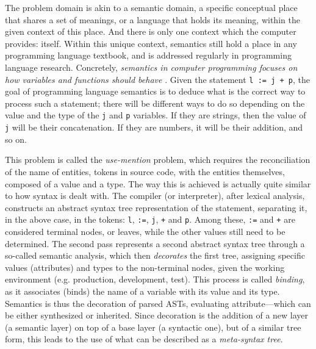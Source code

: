 The problem domain is akin to a semantic domain, a specific conceptual place that shares a set of meanings, or a language that holds its meaning, within the given context of this place. And there is only one context which the computer provides: itself. Within this unique context, semantics still hold a place in any programming language textbook, and is addressed regularly in programming language research. Concretely, \emph{semantics in computer programming focuses on how variables and functions should behave} \citep{sethi_programming_1996}. Given the statement \lstinline{l := j + p}, the goal of programming language semantics is to deduce what is the correct way to process such a statement; there will be different ways to do so depending on the value and the type of the \lstinline{j} and \lstinline{p} variables. If they are strings, then the value of \lstinline{j} will be their concatenation. If they are numbers, it will be their addition, and so on.

This problem is called the \emph{use-mention} problem, which requires the reconciliation of the name of entities, tokens in source code, with the entities themselves, composed of a value and a type. The way this is achieved is actually quite similar to how syntax is dealt with. The compiler (or interpreter), after lexical analysis, constructs an abstract syntax tree representation of the statement, separating it, in the above case, in the tokens: \lstinline{l}, \lstinline{:=}, \lstinline{j}, \lstinline{+} and \lstinline{p}. Among these, \lstinline{:=} and \lstinline{+} are considered terminal nodes, or leaves, while the other values still need to be determined. The second pass represents a second abstract syntax tree through a so-called semantic analysis, which then \emph{decorates} the first tree, assigning specific values (attributes) and types to the non-terminal nodes, given the working environment (e.g. production, development, test). This process is called \emph{binding}, as it associates (binds) the name of a variable with its value and its type. Semantics is thus the decoration of parsed ASTs, evaluating attribute—which can be either synthesized or inherited. Since decoration is the addition of a new layer (a semantic layer) on top of a base layer (a syntactic one), but of a similar tree form, this leads to the use of what can be described as a \emph{meta-syntax tree}.

